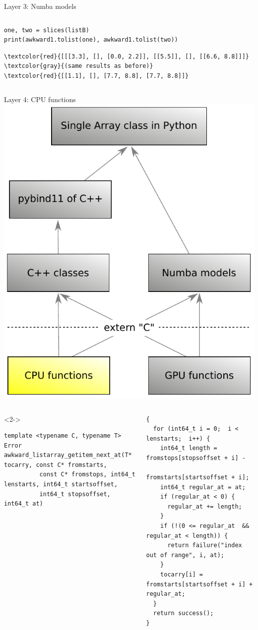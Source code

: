 \documentclass[aspectratio=169]{beamer}
\begin{document}
\begin{frame}[fragile]{Layer 3: Numba models}
\begin{columns}
\begin{uncoverenv}
\begin{verbatim}
one, two = slices(listB)
print(awkward1.tolist(one), awkward1.tolist(two))
\end{verbatim}

\vspace{-0.25 cm}
\begin{Verbatim}[commandchars=\\\{\}]
\textcolor{red}{[[[3.3], [], [0.0, 2.2]], [[5.5]], [], [[6.6, 8.8]]]}    \textcolor{gray}{(same results as before)}
\textcolor{red}{[[1.1], [], [7.7, 8.8], [7.7, 8.8]]}
\end{Verbatim}
\end{uncoverenv}
\end{columns}
\vspace{1 cm}
\end{frame}

\begin{frame}[fragile]{Layer 4: CPU functions}
\vspace{0.5 cm}
\hfill\mbox{\includegraphics[height=4 cm]{awkward-1-0-layers-mini-cpu.pdf}\hspace{-0.75 cm}}

\scriptsize
\vspace{-4.45 cm}
\begin{columns}
\begin{uncoverenv}<2->
\begin{verbatim}
template <typename C, typename T>
Error awkward_listarray_getitem_next_at(T* tocarry, const C* fromstarts,
          const C* fromstops, int64_t lenstarts, int64_t startsoffset,
          int64_t stopsoffset, int64_t at)
\end{verbatim}
\end{uncoverenv}

\vspace{-0.35 cm}
\begin{verbatim}
{
  for (int64_t i = 0;  i < lenstarts;  i++) {
    int64_t length = fromstops[stopsoffset + i] -
                     fromstarts[startsoffset + i];
    int64_t regular_at = at;
    if (regular_at < 0) {
      regular_at += length;
    }
    if (!(0 <= regular_at  &&  regular_at < length)) {
      return failure("index out of range", i, at);
    }
    tocarry[i] = fromstarts[startsoffset + i] + regular_at;
  }
  return success();
}
\end{verbatim}


\end{columns}
\end{frame}
\end{document}

